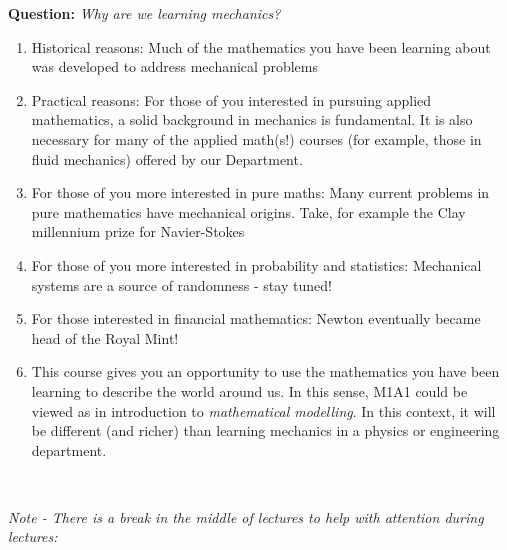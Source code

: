 \documentclass[10pt]{scrartcl}
\begin{document}
\setcounter{section}{-1}
\addtocounter{lecture}{-1}
\setcounter{page}{3}

\textbf{Question:}  \emph{Why are we learning mechanics?}

\begin{enumerate}
\item Historical reasons: Much of the mathematics you have been learning about was developed to address mechanical problems
\item Practical reasons: For those of you interested in pursuing applied mathematics, a solid background in mechanics is fundamental. It is also necessary for many of the applied math(s!) courses (for example, those in fluid mechanics) offered by our Department.
\item For those of you more interested in pure maths: Many current problems in pure mathematics have mechanical origins. Take, for example the Clay millennium prize for Navier-Stokes
\item For those of you more interested in probability and statistics: Mechanical systems are a source of randomness - stay tuned!
\item For those interested in financial mathematics: Newton eventually became head of the Royal Mint!
\item This course gives you an opportunity to use the mathematics you have been learning to describe the world around us. In this sense, M1A1 could be viewed as in introduction to \emph{mathematical modelling}. In this context, it will be different (and richer) than learning mechanics in a physics or engineering department.
\end{enumerate}~

\emph{Note - There is a break in the middle of lectures to help with attention during lectures:} 
\begin{center}
 \end{center}\vsp
 
\end{document}

